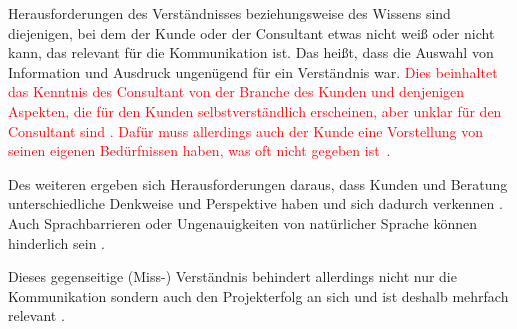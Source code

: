 \documentclass[../main.tex]{subfiles}
\begin{document}
Herausforderungen des Verständnisses beziehungsweise des Wissens sind diejenigen, bei dem der Kunde oder der Consultant etwas nicht weiß oder nicht kann, das relevant für die Kommunikation ist.
Das heißt, dass die Auswahl von Information und Ausdruck ungenügend für ein Verständnis war.
\textcolor{red}{Dies beinhaltet das Kenntnis des Consultant von der Branche des Kunden und denjenigen Aspekten, die für den Kunden selbstverständlich erscheinen, aber unklar für den Consultant sind \autocite{appelbaum2005critical, gamil2017identification, davis2006communication, sutter2019consultants}.
Dafür muss allerdings auch der Kunde eine Vorstellung von seinen eigenen Bedürfnissen haben, was oft nicht gegeben ist \autocite{davis2006communication}.}

Des weiteren ergeben sich Herausforderungen daraus, dass Kunden und Beratung unterschiedliche Denkweise und Perspektive haben und sich dadurch verkennen \autocite{sutter2019consultants}.
Auch Sprachbarrieren oder Ungenauigkeiten von natürlicher Sprache können hinderlich sein \autocite{sayer2013misunderstanding,gamil2017identification}.

Dieses gegenseitige (Miss-) Verständnis behindert allerdings nicht nur die Kommunikation sondern auch den Projekterfolg an sich und ist deshalb mehrfach relevant \autocite{appelbaum2005critical}.
\end{document}

